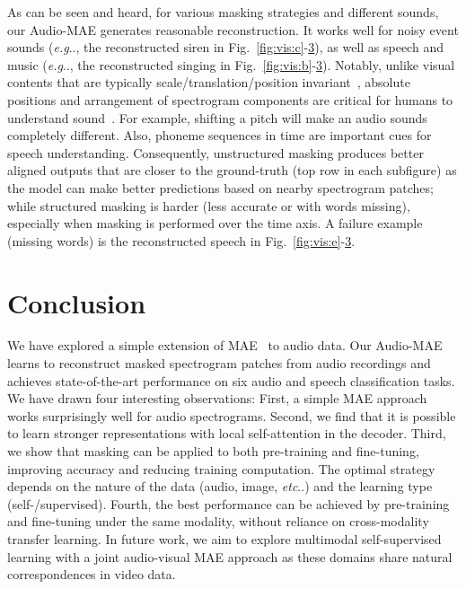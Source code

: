 \documentclass{article}
\makeatletter
\DeclareRobustCommand\onedot{\futurelet\@let@token\@onedot}
\def\@onedot{\ifx\@let@token.\else.\null\fi\xspace}
\def\eg{\emph{e.g}\onedot} \def\Eg{\emph{E.g}\onedot}
\def\etc{\emph{etc}\onedot} \def\vs{\emph{vs}\onedot}
\makeatother
\begin{document}
As can be seen and heard, 
for various masking strategies and different sounds, our Audio-MAE generates reasonable reconstruction.
It works well for noisy event sounds 
(\eg, the reconstructed siren in Fig.~\ref{fig:vis:c}-\href{https://www.dropbox.com/s/avpg02hjikw8o6e/02Ak1eIyj3M_0.7_restored.mp4?dl=0}{3}), 
as well as speech and music 
(\eg, the reconstructed singing in Fig.~\ref{fig:vis:b}-\href{https://www.dropbox.com/s/onmdvpgykphlfx6/DB38NRSHw9A_0.7_restored.mp4?dl=0}{3}).
Notably, unlike visual contents that are typically scale/translation/position invariant~\cite{swin}, absolute positions and arrangement of spectrogram components are critical for humans to understand  sound~\cite{suzuki2004equal}. 
For example, shifting a pitch will make an audio sounds completely different. Also, phoneme sequences in time are important cues for speech understanding. 
Consequently,
unstructured masking produces better aligned outputs that are closer to the ground-truth (top row in each subfigure) as the model can make better predictions based on nearby spectrogram patches; while structured masking is harder (less accurate or with words missing), especially when masking is performed over the time axis.
A failure example (missing words) is the reconstructed speech in Fig.~\ref{fig:vis:e}-\href{https://www.dropbox.com/s/712o434428i4kdv/tzJH5FfR9j8_0.7_2d_restored.mp4?dl=0}{3}. 







\section{Conclusion\label{sec:conclusion}}
We have explored a simple extension of MAE~\cite{mae} to audio data. 
Our Audio-MAE learns to reconstruct masked spectrogram patches from audio recordings and achieves state-of-the-art performance on six audio and speech classification tasks. 
We have drawn four interesting observations: First, a simple MAE approach works surprisingly well for audio spectrograms. 
Second, we find that it is possible to learn stronger representations with local self-attention in the decoder. Third, we show that masking can be applied to both pre-training and fine-tuning, improving accuracy and reducing training computation. The optimal strategy depends on the nature of the data (audio, image, \etc) and the learning type (self-/supervised).
Fourth, the best performance can be achieved by pre-training and fine-tuning under the same modality, without reliance on cross-modality transfer learning.
In future work, we aim to explore multimodal self-supervised learning with a joint audio-visual MAE approach as these domains share natural correspondences in video data. 
\end{document}
